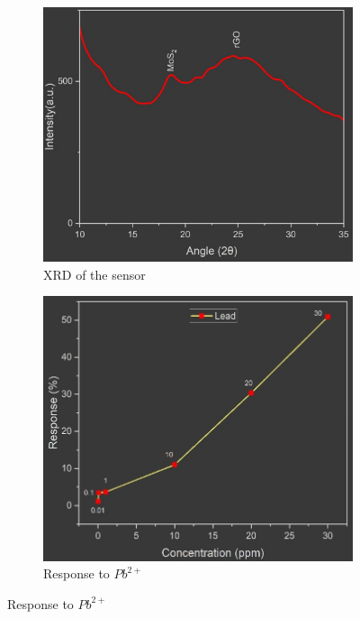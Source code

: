 \documentclass[11pt,a5paper]{article}
\begin{document}
\begin{figure}[t]
    \begin{subfigure}[b]{0.325\textwidth}
        \centering
        \includegraphics[width=\linewidth]{xrd.png}
        \caption{XRD of the sensor}
    \end{subfigure}
    \hfill
    \begin{subfigure}[b]{0.325\textwidth}
        \centering
        \includegraphics[width=\linewidth]{lead_ion.png}
        \caption{Response to $Pb^{2+}$}
    \end{subfigure}
    \hfill

\end{figure}
\end{document}
